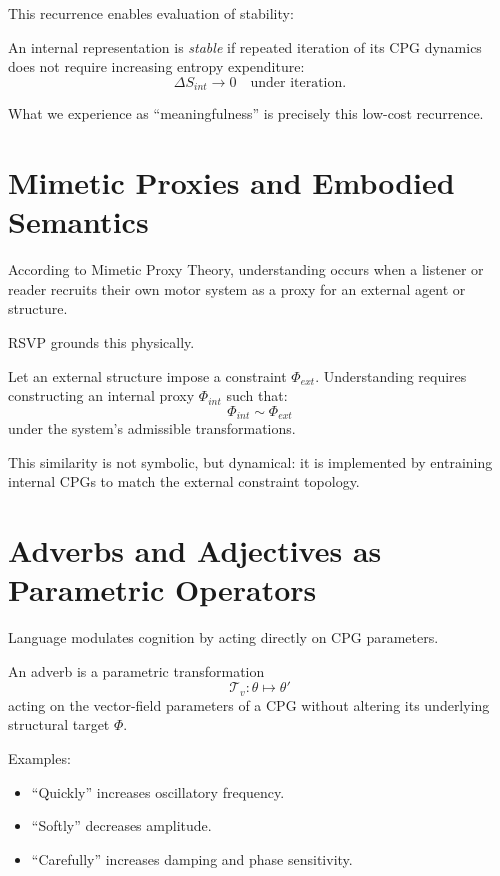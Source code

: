 \documentclass[11pt]{book}
\begin{document}
This recurrence enables evaluation of stability:

\begin{definition}
An internal representation is \emph{stable} if repeated iteration of its CPG dynamics does not require increasing entropy expenditure:
\[
\Delta S_{int} \rightarrow 0 \quad \text{under iteration.}
\]
\end{definition}

What we experience as “meaningfulness” is precisely this low-cost recurrence.

\section{Mimetic Proxies and Embodied Semantics}

According to Mimetic Proxy Theory, understanding occurs when a listener or reader recruits their own motor system as a proxy for an external agent or structure.

RSVP grounds this physically.

Let an external structure impose a constraint \(\Phi_{ext}\). Understanding requires constructing an internal proxy \(\Phi_{int}\) such that:
\[
\Phi_{int} \sim \Phi_{ext}
\]
under the system’s admissible transformations.

This similarity is not symbolic, but dynamical: it is implemented by entraining internal CPGs to match the external constraint topology.

\section{Adverbs and Adjectives as Parametric Operators}

Language modulates cognition by acting directly on CPG parameters.

\begin{definition}
An adverb is a parametric transformation
\[
\mathcal{T}_v : \theta \mapsto \theta'
\]
acting on the vector-field parameters of a CPG without altering its underlying structural target \(\Phi\).
\end{definition}

Examples:
\begin{itemize}
\item “Quickly” increases oscillatory frequency.
\item “Softly” decreases amplitude.
\item “Carefully” increases damping and phase sensitivity.
\end{itemize}
\end{document}
